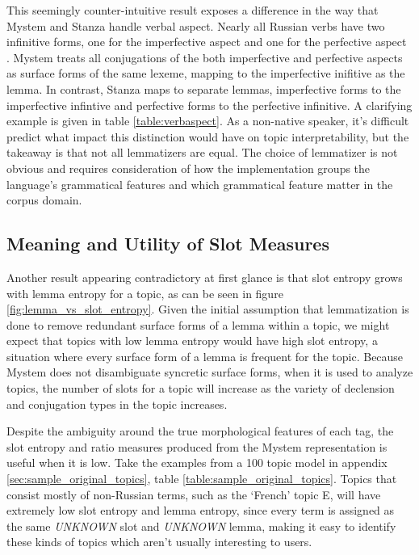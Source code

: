 \documentclass[11pt,a4paper]{article}
\begin{document}
This seemingly counter-intuitive result exposes a difference in the way that Mystem and Stanza handle verbal aspect. Nearly all Russian verbs have two infinitive forms, one for the imperfective aspect and one for the perfective aspect \cite{wade2020comprehensive}. Mystem treats all conjugations of the both imperfective and perfective aspects as surface forms of the same lexeme, mapping to the imperfective inifitive as the lemma. In contrast, Stanza maps to separate lemmas, imperfective forms to the imperfective infintive and perfective forms to the perfective infinitive. A clarifying example is given in table \ref{table:verbaspect}. As a non-native speaker, it's difficult predict what impact this distinction would have on topic interpretability, but the takeaway is that not all lemmatizers are equal. The choice of lemmatizer is not obvious and requires consideration of how the implementation groups the language's grammatical features and which grammatical feature matter in the corpus domain.

\subsection{Meaning and Utility of Slot Measures}
\label{sec:slot_meaning}
Another result appearing contradictory at first glance is that slot entropy grows with lemma entropy for a topic, as can be seen in figure \ref{fig:lemma_vs_slot_entropy}. Given the initial assumption that lemmatization is done to remove redundant surface forms of a lemma within a topic, we might expect that topics with low lemma entropy would have high slot entropy, a situation where every surface form of a lemma is frequent for the topic. Because Mystem does not disambiguate syncretic surface forms, when it is used to analyze topics, the number of slots for a topic will increase as the variety of declension and conjugation types in the topic increases.

Despite the ambiguity around the true morphological features of each tag, the slot entropy and ratio measures produced from the Mystem representation is useful when it is low. Take the examples from a 100 topic model in appendix \ref{sec:sample_original_topics}, table \ref{table:sample_original_topics}. Topics that consist mostly of non-Russian terms, such as the `French' topic E, will have extremely low slot entropy and lemma entropy, since every term is assigned as the same \textit{UNKNOWN} slot and \textit{UNKNOWN} lemma, making it easy to identify these kinds of topics which aren't usually interesting to users.
\end{document}
